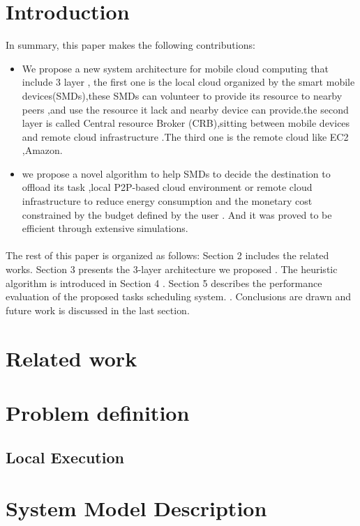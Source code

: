 \documentclass[review]{elsarticle}
\begin{document}

\section{Introduction}
In summary, this paper makes the following contributions:
\begin{itemize}
    \item We propose a new system architecture for mobile cloud computing that include 3 layer , the first one is the local cloud organized by the smart  mobile devices(SMDs),these SMDs can volunteer to provide its resource to nearby peers ,and use the resource it lack and nearby device can provide.the second layer is called Central resource Broker (CRB),sitting between mobile devices and remote cloud infrastructure .The third one is the remote cloud like EC2 ,Amazon.

    \item  we propose a novel algorithm to help SMDs to decide the destination to offload its task ,local P2P-based cloud environment or remote cloud infrastructure to reduce energy consumption and the monetary cost constrained by the budget defined by the user . And it was proved to be efficient  through extensive simulations.
\end{itemize}

\paragraph{}%
    The rest of this paper is organized as follows: Section 2 includes the related works. Section 3 presents the 3-layer architecture we proposed . The heuristic algorithm is introduced in Section 4 . Section 5 describes the performance evaluation of the proposed tasks scheduling system. . Conclusions are drawn and future work is discussed in the last section.

\section{Related work}
\section{Problem definition}
     \subsection{Local Execution}

\section{System Model Description}
\end{document}
